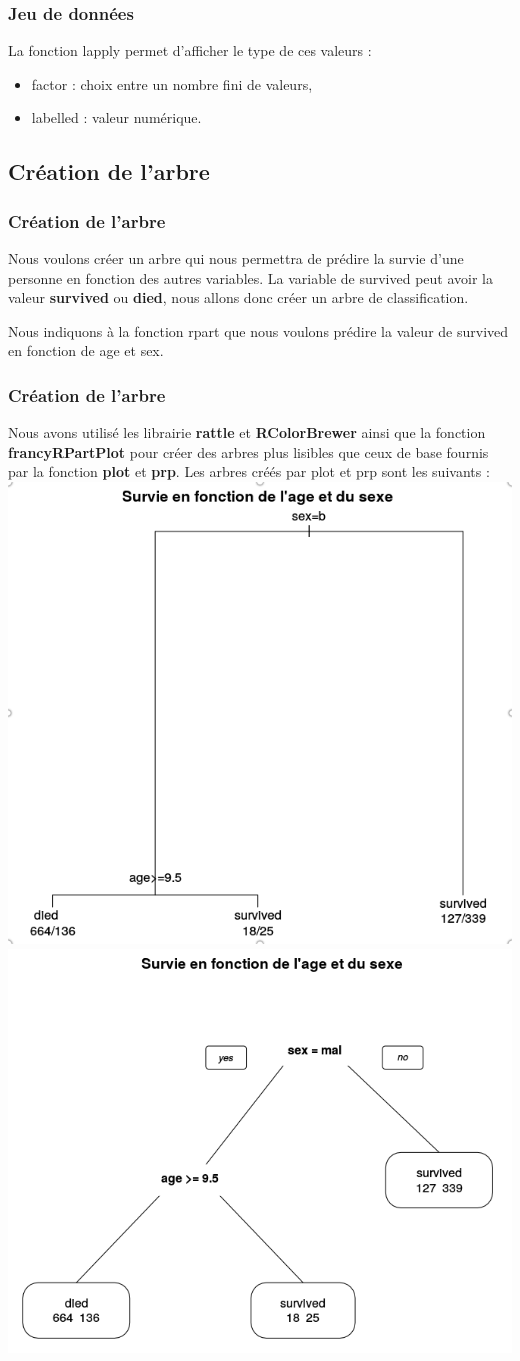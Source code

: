 \documentclass[compress]{beamer}
\begin{document}
\begin{frame}
 \frametitle{Jeu de données}
 La fonction \textrm{lapply} permet d'afficher le type de ces valeurs : 
 \begin{itemize}
  \item factor : choix entre un nombre fini de valeurs,
  \item labelled : valeur numérique.
 \end{itemize}
 
\end{frame}

\subsection{Création de l'arbre}
\begin{frame}
\frametitle{Création de l'arbre}
Nous voulons créer un arbre qui nous permettra de prédire la survie d'une personne en fonction des autres variables. La variable de \textrm{survived} peut avoir la valeur 
\textbf{survived} ou \textbf{died}, nous allons donc créer un arbre de classification.\newline

Nous indiquons à la fonction \textrm{rpart} que nous voulons prédire la valeur de \textrm{survived} en fonction de \textrm{age} et \textrm{sex}.\newline

\end{frame}
\begin{frame}
 \frametitle{Création de l'arbre}
Nous avons utilisé les librairie \textbf{rattle} et \textbf{RColorBrewer} ainsi que la fonction \textbf{francyRPartPlot} pour 
créer des arbres plus lisibles que ceux de base fournis par la fonction \textbf{plot} et \textbf{prp}.
Les arbres créés par \textrm{plot} et \textrm{prp} sont les suivants : \\
\includegraphics[width=.5\textwidth,height=1\textheight,keepaspectratio]{img/plot.png}%
\includegraphics[width=.5\textwidth,height=1\textheight,keepaspectratio]{img/prp.png}
\end{frame}
\end{document}
